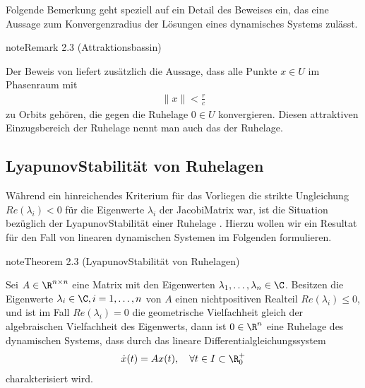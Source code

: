 \documentclass[letterpaper,10pt,german]{jupyterBook}
\begin{document}
\sphinxAtStartPar
Folgende Bemerkung geht speziell auf ein Detail des Beweises ein, das eine Aussage zum Konvergenzradius der Lösungen eines dynamisches Systems zulässt.
\label{odestability/ruhelagen:remark-6}
\begin{sphinxadmonition}{note}{Remark 2.3 (Attraktionsbassin)}



\sphinxAtStartPar
Der Beweis von {\hyperref[\detokenize{odestability/ruhelagen:thm:stabasymallg}]{}} liefert zusätzlich die Aussage, dass alle Punkte \(x\in U\) im Phasenraum mit
\begin{equation*}
\begin{split}\|x\| < \frac{r}{c}\end{split}
\end{equation*}
\sphinxAtStartPar
zu Orbits gehören, die gegen die Ruhelage \(0 \in U\) konvergieren.
Diesen attraktiven Einzugsbereich der Ruhelage nennt man auch das  der Ruhelage.
\end{sphinxadmonition}


\subsection{Lyapunov\sphinxhyphen{}Stabilität von Ruhelagen}
\label{\detokenize{odestability/ruhelagen:lyapunov-stabilitat-von-ruhelagen}}
\sphinxAtStartPar
Während ein hinreichendes Kriterium für das Vorliegen  die strikte Ungleichung \(Re(\lambda_i)<0\) für die Eigenwerte \(\lambda_i\) der Jacobi\sphinxhyphen{}Matrix war, ist die Situation bezüglich der Lyapunov\sphinxhyphen{}Stabilität einer Ruhelage .
Hierzu wollen wir ein Resultat für den Fall von linearen dynamischen Systemen im Folgenden formulieren.
\label{odestability/ruhelagen:thm:stablyaplinear}
\begin{sphinxadmonition}{note}{Theorem 2.3 (Lyapunov\sphinxhyphen{}Stabilität von Ruhelagen)}



\sphinxAtStartPar
Sei \(A\in \R^{n\times n}\) eine Matrix mit den Eigenwerten \(\lambda_1,\dots, \lambda_n\in \C\).
Besitzen die Eigenwerte \(\lambda_i \in \C, i=1,\ldots,n\) von \(A\) einen nicht\sphinxhyphen{}positiven Realteil \(Re(\lambda_i) \leq 0\), und ist im Fall \(Re(\lambda_i)=0\) die geometrische Vielfachheit gleich der algebraischen Vielfachheit des Eigenwerts, dann ist \(0\in \R^n\) eine  Ruhelage des dynamischen Systems, dass durch das lineare Differentialgleichungssystem
\begin{equation*}
\begin{split}\dot{x}(t) = Ax(t), \quad  \forall t \in I \subset \R^+_0\end{split}
\end{equation*}
\sphinxAtStartPar
charakterisiert wird.
\end{sphinxadmonition}
\end{document}
